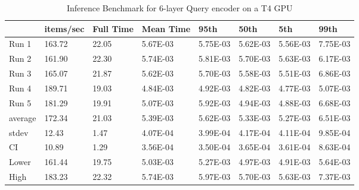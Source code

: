 \begin{table*}[!ht]
    \centering
    \begin{tabular}{|l|l|l|l|l|l|l|l|}
    \hline
        ~ & items/sec & Full Time & Mean Time & 95th & 50th & 5th & 99th \\ \hline
        Run 1 & 163.72 & 22.05 & 5.67E-03 & 5.75E-03 & 5.62E-03 & 5.56E-03 & 7.75E-03 \\ \hline
        Run 2 & 161.90 & 22.30 & 5.74E-03 & 5.81E-03 & 5.70E-03 & 5.63E-03 & 6.17E-03 \\ \hline
        Run 3 & 165.07 & 21.87 & 5.62E-03 & 5.70E-03 & 5.58E-03 & 5.51E-03 & 6.86E-03 \\ \hline
        Run 4 & 189.71 & 19.03 & 4.84E-03 & 4.92E-03 & 4.82E-03 & 4.77E-03 & 5.07E-03 \\ \hline
        Run 5 & 181.29 & 19.91 & 5.07E-03 & 5.92E-03 & 4.94E-03 & 4.88E-03 & 6.68E-03 \\ \hline
        average & 172.34 & 21.03 & 5.39E-03 & 5.62E-03 & 5.33E-03 & 5.27E-03 & 6.51E-03 \\ \hline
        stdev & 12.43 & 1.47 & 4.07E-04 & 3.99E-04 & 4.17E-04 & 4.11E-04 & 9.85E-04 \\ \hline
        CI & 10.89 & 1.29 & 3.56E-04 & 3.50E-04 & 3.65E-04 & 3.61E-04 & 8.63E-04 \\ \hline
        Lower & 161.44 & 19.75 & 5.03E-03 & 5.27E-03 & 4.97E-03 & 4.91E-03 & 5.64E-03 \\ \hline
        High & 183.23 & 22.32 & 5.74E-03 & 5.97E-03 & 5.70E-03 & 5.63E-03 & 7.37E-03 \\ \hline
    \end{tabular}
    \caption{Inference Benchmark for 6-layer Query encoder on a T4 GPU}
    \label{tab:benchmark-gpu-6layer}
\end{table*}


